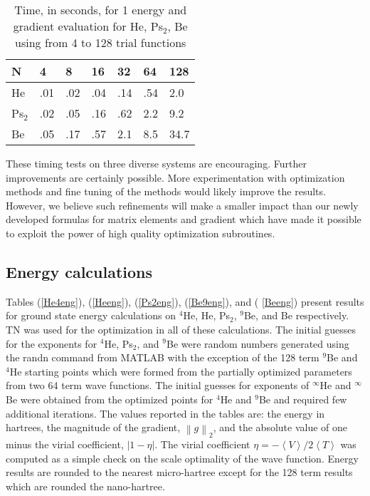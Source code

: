 \documentclass[12pt,thmsa]{article}
\begin{document}
\begin{table}[p] \centering%
\begin{tabular}{lllllll}
\hline\hline
N & 4 & 8 & 16 & 32 & 64 & 128 \\ \hline
He & .01 & .02 & .04 & .14 & .54 & 2.0 \\ 
Ps$_2$ & .02 & .05 & .16 & .62 & 2.2 & 9.2 \\ 
Be & .05 & .17 & .57 & 2.1 & 8.5 & 34.7 \\ \hline\hline
\end{tabular}
\caption{Time, in seconds, for 1 energy and gradient evaluation for
 He, Ps$_{2}$, Be using from 4 to 128 trial functions\label{egtime}}%
\end{table}%

These timing tests on three diverse systems are encouraging. Further
improvements are certainly possible. More experimentation with optimization
methods and fine tuning of the methods would likely improve the results.
However, we believe such refinements will make a smaller impact than our
newly developed formulas for matrix elements and gradient which have made it
possible to exploit the power of high quality optimization subroutines.

\subsection{Energy calculations}

Tables (\ref{He4eng}), (\ref{Heeng}), (\ref{Ps2eng}), (\ref{Be9eng}), and (%
\ref{Beeng}) present results for ground state energy calculations on $^4$He,
He, Ps$_2$, $^9$Be, and Be respectively. TN was used for the optimization in
all of these calculations. The initial guesses for the exponents for $^4$He,
Ps$_2$, and $^9$Be were random numbers generated using the randn command
from MATLAB with the exception of the 128 term $^9$Be and $^4$He starting
points which were formed from the partially optimized parameters from two 64
term wave functions. The initial guesses for exponents of $^\infty $He and $%
^\infty $Be were obtained from the optimized points for $^4$He and $^9$Be
and required few additional iterations. The values reported in the tables
are: the energy in hartrees, the magnitude of the gradient, $\left\|
g\right\| _2$, and the absolute value of one minus the virial coefficient, $%
\left| 1-\eta \right| $. The virial coefficient $\eta =-\left\langle
V\right\rangle /2\left\langle T\right\rangle $ was computed as a simple
check on the scale optimality of the wave function. Energy results are
rounded to the nearest micro-hartree except for the 128 term results which
are rounded the nano-hartree.
\end{document}
